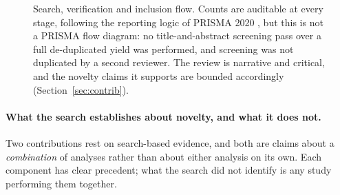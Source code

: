\begin{figure}[H]
{}
\caption{Search, verification and inclusion flow. Counts are auditable at every
  stage, following the reporting logic of PRISMA 2020 \cite{page2021prisma},
  but this is not a PRISMA flow diagram: no title-and-abstract screening pass
  over a full de-duplicated yield was performed, and screening was not
  duplicated by a second reviewer. The review is narrative and critical, and
  the novelty claims it supports are bounded accordingly
  (Section~\ref{sec:contrib}).}
\label{fig:prisma}
\end{figure}

\paragraph{What the search establishes about novelty, and what it does not.}
Two contributions rest on search-based evidence, and both are claims about a
\emph{combination} of analyses rather than about either analysis on its own.
Each component has clear precedent; what the search did not identify is any
study performing them together.

